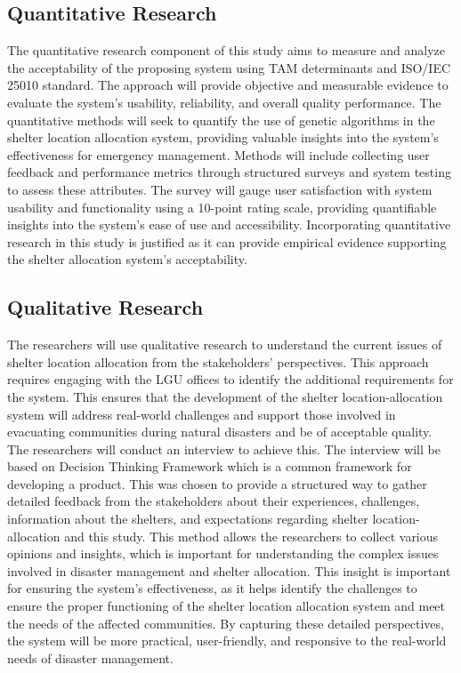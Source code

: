 \subsection{Quantitative Research}
	The quantitative research component of this study aims to measure and analyze the acceptability of the proposing system using TAM determinants and ISO/IEC 25010 standard. The approach will provide objective and measurable evidence to evaluate the system's usability, reliability, and overall quality performance. The quantitative methods will seek to quantify the use of genetic algorithms in the shelter location allocation system, providing valuable insights into the system's effectiveness for emergency management.
	Methods will include collecting user feedback and performance metrics through structured surveys and system testing to assess these attributes. The survey will gauge user satisfaction with system usability and functionality using a 10-point rating scale, providing quantifiable insights into the system's ease of use and accessibility. 
	Incorporating quantitative research in this study is justified as it can provide empirical evidence supporting the shelter allocation system's acceptability. 

\subsection{Qualitative Research}
	The researchers will use qualitative research to understand the current issues of shelter location allocation from the stakeholders' perspectives. This approach requires engaging with the LGU offices to identify the additional requirements for the system. This ensures that the development of the shelter location-allocation system will address real-world challenges and support those involved in evacuating communities during natural disasters and be of acceptable quality.
	The researchers will conduct an interview to achieve this. The interview will be based on Decision Thinking Framework which is a common framework for developing a product. This was chosen to provide a structured way to gather detailed feedback from the stakeholders about their experiences, challenges, information about the shelters, and expectations regarding shelter location-allocation and this study. This method allows the researchers to collect various opinions and insights, which is important for understanding the complex issues involved in disaster management and shelter allocation.
	This insight is important for ensuring the system's effectiveness, as it helps identify the challenges to ensure the proper functioning of the shelter location allocation system and meet the needs of the affected communities. By capturing these detailed perspectives, the system will be more practical, user-friendly, and responsive to the real-world needs of disaster management.

